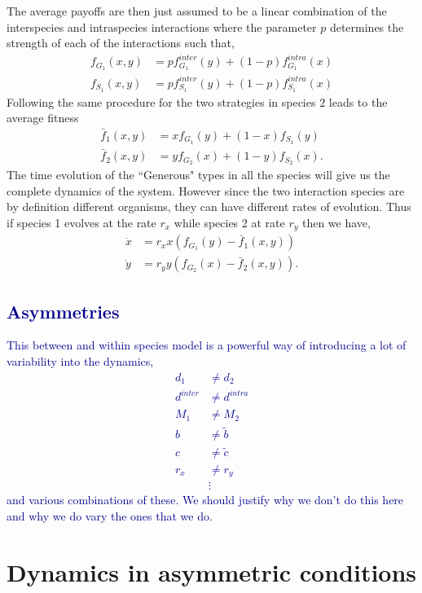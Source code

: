 \documentclass{pnastwo}
\newcommand{\cha}[1]{\textcolor{darkblue}{#1}}
\begin{document}
\begin{article}
The average payoffs are then just assumed to be a linear combination of the interspecies and intraspecies interactions where the parameter $p$ determines the strength of each of the interactions such that,
%
\begin{align}
	f_{G_1} (x,y) &= p f^{inter}_{G_1} (y) + (1-p) f^{intra}_{G_1} (x) \\
	f_{S_1} (x,y) &= p f^{inter}_{S_1} (y) + (1-p) f^{intra}_{S_1} (x)
\label{fiteqs}
\end{align}
%
Following the same procedure for the two strategies in species $2$ leads to the average fitness
%
\begin{align}
\bar{f}_1 (x,y) &= x f_{G_1} (y)+(1-x) f_ {S_1}(y)\\
\bar{f}_2 (x,y) &= y f_{G_2} (x)+(1-y) f_{S_2}(x).
\label{avgfiteqs}
\end{align}
%
The time evolution of the ``Generous" types in all the species will give us the complete dynamics of the system.
However since the two interaction species are by definition different organisms, they can have different rates of evolution.
Thus if species 1 evolves at the rate $r_x$ while species 2 at rate $r_y$ then we have,
\begin{align}
\dot{x} &= r_x x \left(f_{G_1}(y) -  \bar{f}_1(x,y) \right) \nonumber \\
\dot{y} &= r_y y \left(f_{G_2}(x) -  \bar{f}_2(x,y) \right).
\label{eq:repeqs}
\end{align}



\cha{\section{Asymmetries}}

\cha{This between and within species model is a powerful way of introducing a lot of variability into the dynamics,
\begin{align}
	d_1 &\neq d_2 \\
	d^{inter} &\neq d^{intra} \\
	M_1 &\neq M_2 \\
	b &\neq \tilde{b} \\
	c &\neq \tilde{c} \\
	r_x &\neq r_y \\
	&\vdots
\end{align}
and various combinations of these. We should justify why we don't do this here and why we do vary the ones that we do.}


\section{Dynamics in asymmetric conditions}


\end{article}
\end{document}
